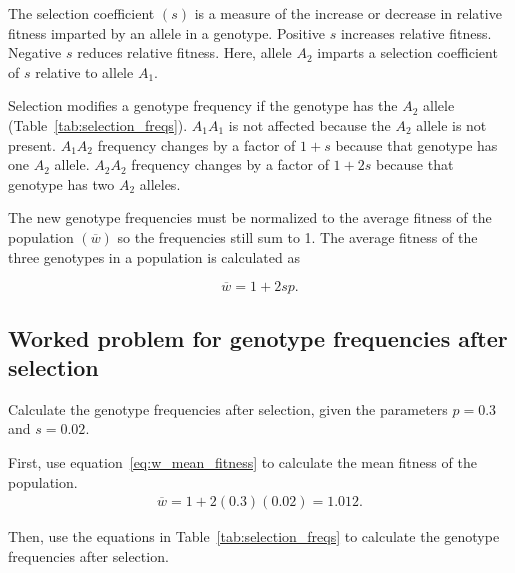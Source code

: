 \documentclass[letterpaper,nofonts]{tufte-handout}
\begin{document}
 The selection coefficient $(s)$ is a measure of the increase or decrease in relative fitness imparted by an allele in a genotype.  Positive $s$ increases relative fitness.
 Negative $s$ reduces relative fitness. Here, allele $A_2$ imparts a selection coefficient of $s$ relative to allele $A_1.$
 
Selection modifies a genotype frequency if the genotype has the $A_2$ allele (Table~\ref{tab:selection_freqs}). $A_1A_1$ is not affected because the $A_2$ allele is not present.
%
%
$A_1A_2$ frequency changes by a factor of $1 + s$ because that genotype has one $A_2$ allele. $A_2A_2$ frequency changes by a factor of $1+2s$ because that genotype has two $A_2$ alleles. 


%
The new genotype frequencies must be normalized
%
%
to the average fitness of the population $(\overline{w})$ so the frequencies still sum to 1. The average fitness of the three genotypes in a population is calculated as


%
\begin{equation}\label{eq:w_mean_fitness}
\overline{w} = 1 + 2sp.
\end{equation}



\subsection*{Worked problem for genotype frequencies after selection}

Calculate the genotype frequencies after selection, given the parameters $p = 0.3$ and $s = 0.02.$ 

First, use equation~\ref{eq:w_mean_fitness} to calculate the mean fitness of the population.
\begin{align*}
\overline{w} = 1 + 2(0.3)(0.02) = 1.012.
\end{align*}

Then, use the equations in Table~\ref{tab:selection_freqs} to calculate the genotype frequencies after selection.
\end{document}
